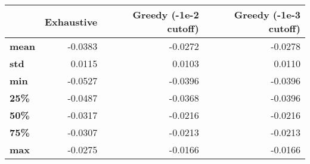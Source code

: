 \begin{tabular}{lrrr}
\toprule
{} &  Exhaustive &  Greedy (-1e-2 cutoff) &  Greedy (-1e-3 cutoff) \\
\midrule
\textbf{mean} &     -0.0383 &                -0.0272 &                -0.0278 \\
\textbf{std } &      0.0115 &                 0.0103 &                 0.0110 \\
\textbf{min } &     -0.0527 &                -0.0396 &                -0.0396 \\
\textbf{25\% } &     -0.0487 &                -0.0368 &                -0.0396 \\
\textbf{50\% } &     -0.0317 &                -0.0216 &                -0.0216 \\
\textbf{75\% } &     -0.0307 &                -0.0213 &                -0.0213 \\
\textbf{max } &     -0.0275 &                -0.0166 &                -0.0166 \\
\bottomrule
\end{tabular}
